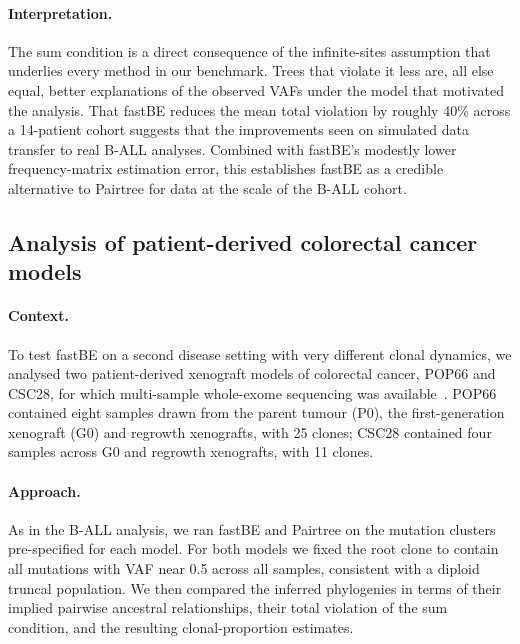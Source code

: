 \documentclass[11pt]{article}
\begin{document}
\paragraph{Interpretation.}
The sum condition is a direct consequence of the infinite-sites assumption that underlies every method in our benchmark. Trees that violate it less are, all else equal, better explanations of the observed VAFs under the model that motivated the analysis. That fastBE reduces the mean total violation by roughly 40\% across a 14-patient cohort suggests that the improvements seen on simulated data transfer to real B-ALL analyses. Combined with fastBE's modestly lower frequency-matrix estimation error, this establishes fastBE as a credible alternative to Pairtree for data at the scale of the B-ALL cohort.

\subsection{Analysis of patient-derived colorectal cancer models}

\paragraph{Context.}
To test fastBE on a second disease setting with very different clonal dynamics, we analysed two patient-derived xenograft models of colorectal cancer, POP66 and CSC28, for which multi-sample whole-exome sequencing was available~\citep{rehman2021diapause,ulintz2018polyclonal}. POP66 contained eight samples drawn from the parent tumour (P0), the first-generation xenograft (G0) and regrowth xenografts, with 25 clones; CSC28 contained four samples across G0 and regrowth xenografts, with 11 clones.

\paragraph{Approach.}
As in the B-ALL analysis, we ran fastBE and Pairtree on the mutation clusters pre-specified for each model. For both models we fixed the root clone to contain all mutations with VAF near 0.5 across all samples, consistent with a diploid truncal population. We then compared the inferred phylogenies in terms of their implied pairwise ancestral relationships, their total violation of the sum condition, and the resulting clonal-proportion estimates.
\end{document}
